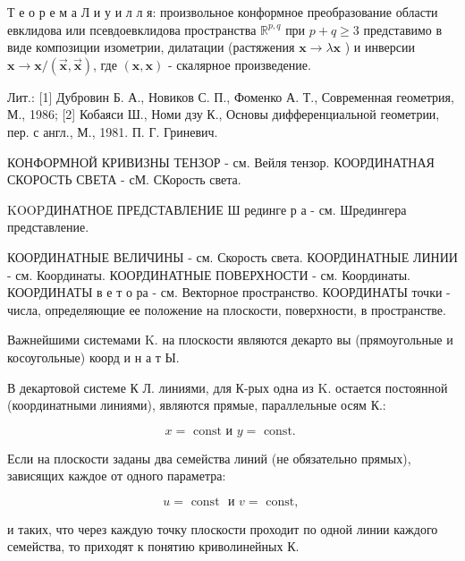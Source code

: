 \documentclass[10pt]{article}
\begin{document}
Т е о р е м а Л и у и л л я: произвольное конформное преобразование области евклидова или псевдоевклидова пространства $\mathbb{R}^{p, q}$ при $p+q \geqslant 3$ представимо в виде композиции изометрии, дилатации (растяжения $\boldsymbol{x} \rightarrow \lambda \boldsymbol{x}$ ) и инверсии $\boldsymbol{x} \rightarrow \boldsymbol{x} /(\overrightarrow{\boldsymbol{x}}, \overrightarrow{\boldsymbol{x}})$, где $(\boldsymbol{x}, \boldsymbol{x})$ - скалярное произведение.



Лит.: [1] Дубровин Б. А., Новиков С. П., Фоменко А. Т., Современная геометрия, М., 1986; [2] Кобаяси Ш., Номи дзу К., Основы дифференциальной геометрии, пер. с англ., М., 1981. П. Г. Гриневич.



КОНФОРМНОЙ КРИВИЗНЫ ТЕНЗОР - см. Вейля тензор. КООРДИНАТНАЯ СКОРОСТЬ СВЕТА - сМ. СКорость света.



KOOPДИНАТНОЕ ПРЕДСТАВЛЕНИЕ Ш рединге р а - см. Шредингера представление.



КООРДИНАТНЫЕ ВЕЛИЧИНЫ - см. Скорость света. КООРДИНАТНЫЕ ЛИНИИ - см. Координаты. КООРДИНАТНЫЕ ПОВЕРХНОСТИ - см. Координаты. КООРДИНАТЫ в е т о ра - см. Векторное пространство. КООРДИНАТЫ точки - числа, определяющие ее положение на плоскости, поверхности, в пространстве.



Важнейшими системами K. на плоскости являются декарто вы (прямоугольные и косоугольные) коорд и н а т Ы.



В декартовой системе К Л. линиями, для К-рых одна из $\mathrm{K}$. остается постоянной (координатными линиями), являются прямые, параллельные осям К.:



\[

x=\text { const и } y=\text { const. }

\]



Если на плоскости заданы два семейства линий (не обязательно прямых), зависящих каждое от одного параметра:



\[

u=\text { const } \text { и } v=\text { const, }

\]



и таких, что через каждую точку плоскости проходит по одной линии каждого семейства, то приходят к понятию криволинейных К.
\end{document}
